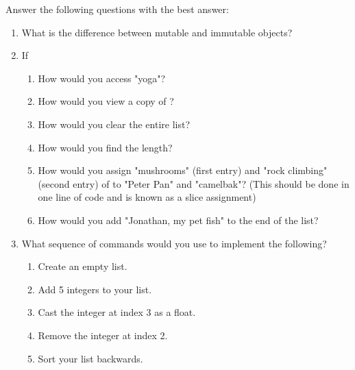 \begin{problem}
Answer the following questions with the best answer:

\begin{enumerate}

\item What is the difference between mutable and immutable objects?
\item If 
\begin{enumerate}

	\item How would you access "yoga"? 
	\item How would you view a copy of ?
	\item How would you clear the entire list? 
	\item How would you find the length? 
	\item How would you assign "mushrooms" (first entry) and "rock climbing" (second entry) 
	of  to "Peter Pan" and "camelbak"? 
	(This should be done in one line of code and is known as a slice assignment)
	\item How would you add "Jonathan, my pet fish" to the end of the list?

\end{enumerate}
\item What sequence of commands would you use to implement the following?

\begin{enumerate}
\item Create an empty list. 
\item Add 5 integers to your list. 
\item Cast the integer at index 3 as a float.
\item Remove the integer at index 2. 
\item Sort your list backwards.

\end{enumerate}
\end{enumerate}
\end{problem}


